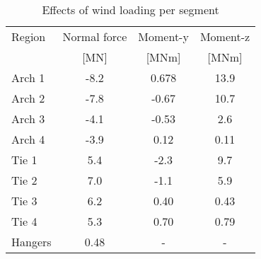 \begin{table}[H] 
\caption{Effects of wind loading per segment}
\label{tab:effects_wind_load}
\centering
\begin{tabular}{lccc}
\hline
Region & Normal force & Moment-y & Moment-z \\
 & [MN]   & [MNm] & [MNm] \\ \hline
Arch 1 & -8.2 & 0.678 & 13.9\\
Arch 2 & -7.8 & -0.67 & 10.7\\
Arch 3 & -4.1 & -0.53 & 2.6\\
Arch 4 & -3.9 & 0.12 & 0.11\\
Tie 1 & 5.4 & -2.3 & 9.7\\
Tie 2 & 7.0 & -1.1 & 5.9\\
Tie 3 & 6.2 & 0.40 & 0.43\\
Tie 4 & 5.3 & 0.70 & 0.79\\
Hangers & 0.48 & - & - \\ \hline
\end{tabular}
\end{table}
